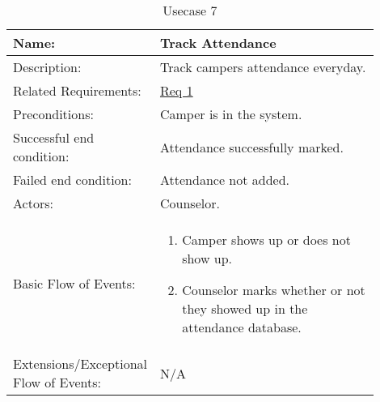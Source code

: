 \documentclass[11pt]{article}
\begin{document}

\begin{table}[!htb]
\caption{Usecase 7}
\label{des:track attendance}
\begin{center}
\begin{tabular}{p{0.30\linewidth}p{0.60\linewidth}}
	Name: & Track Attendance\\\hline
	Description: & Track campers attendance everyday.\\\hline
	Related Requirements:& \hyperlink{Req1}{Req 1}\\\hline
	Preconditions:& Camper is in the system.\\\hline
	Successful end condition:& Attendance successfully marked. \\\hline
	Failed end condition:& Attendance not added.\\\hline
	Actors:& Counselor. \\\hline
	Basic Flow of Events: & \begin{enumerate}[topsep=0pt]
		\item Camper shows up or does not show up.
		\item Counselor marks whether or not they showed up in the attendance database.
	\end{enumerate}\\\hline
	Extensions/Exceptional Flow of Events: & \vspace*{.25em}  N/A
\end{tabular}
\end{center}
\end{table}
\end{document}
